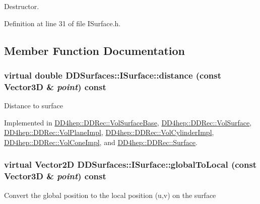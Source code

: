 Destructor. 

Definition at line 31 of file ISurface.h.

\subsection{Member Function Documentation}
\hypertarget{class_d_d_surfaces_1_1_i_surface_a430ebd157354388b50218dfb356a9ca1}{
\subsubsection[{distance}]{\setlength{\rightskip}{0pt plus 5cm}virtual double DDSurfaces::ISurface::distance (const {\bf Vector3D} \& {\em point}) const}}
\label{class_d_d_surfaces_1_1_i_surface_a430ebd157354388b50218dfb356a9ca1}
Distance to surface 

Implemented in \hyperlink{class_d_d4hep_1_1_d_d_rec_1_1_vol_surface_base_afb85bf6e8e6b87fb52e67e26609b1048}{DD4hep::DDRec::VolSurfaceBase}, \hyperlink{class_d_d4hep_1_1_d_d_rec_1_1_vol_surface_aeabe1f73edf8b917bede275fb8f2d4a3}{DD4hep::DDRec::VolSurface}, \hyperlink{class_d_d4hep_1_1_d_d_rec_1_1_vol_plane_impl_ad75ba6e93463cf8ce312d312111c8391}{DD4hep::DDRec::VolPlaneImpl}, \hyperlink{class_d_d4hep_1_1_d_d_rec_1_1_vol_cylinder_impl_adb7ecbd032387e6e2a2903251e66e490}{DD4hep::DDRec::VolCylinderImpl}, \hyperlink{class_d_d4hep_1_1_d_d_rec_1_1_vol_cone_impl_a28c958945f374cc59491e7ac4850bbde}{DD4hep::DDRec::VolConeImpl}, and \hyperlink{class_d_d4hep_1_1_d_d_rec_1_1_surface_a6c791cb45a57af72d629fc44ea208df4}{DD4hep::DDRec::Surface}.\hypertarget{class_d_d_surfaces_1_1_i_surface_a0d6db86d4871584a9e72ac6018229737}{
\subsubsection[{globalToLocal}]{\setlength{\rightskip}{0pt plus 5cm}virtual {\bf Vector2D} DDSurfaces::ISurface::globalToLocal (const {\bf Vector3D} \& {\em point}) const}}
\label{class_d_d_surfaces_1_1_i_surface_a0d6db86d4871584a9e72ac6018229737}
Convert the global position to the local position (u,v) on the surface 

